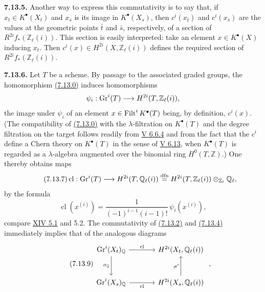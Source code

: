 \textbf{7.13.5.}
Another way to express this commutativity is to say that, if
$x_t\in K^\bullet(X_t)$ and $x_s$ is its image in $K^\bullet(X_s)$, then
$c^i(x_{\bar t})$ and $c^i(x_{\bar s})$ are the values at the geometric
points $\bar t$ and $\bar s$, respectively, of a section of
$R^{2i}f_*(\mathbb Z_\ell(i))$. This section is easily interpreted: take an
element $x\in K^\bullet(X)$ inducing $x_t$. Then
$c^i(x)\in H^{2i}(X,\mathbb Z_\ell(i))$ defines the required section of
$R^{2i}f_*(\mathbb Z_\ell(i))$.

\textbf{7.13.6.}
Let $T$ be a scheme. By passage to the associated graded groups, the
homomorphism \hyperlink{sga6.e10.eq.7-13-0}{(7.13.0)} induces homomorphisms
\[
\psi_i:\operatorname{Gr}^i(T)\longrightarrow H^{2i}(T,\mathbb Z_\ell(i)),
\]
the image under $\psi_i$ of an element $x\in\operatorname{Filt}^iK^\bullet(T)$ being, by
definition, $c^i(x)$. (The compatibility of \hyperlink{sga6.e10.eq.7-13-0}{(7.13.0)} with the
$\lambda$-filtration on
$K^\bullet(T)$ and the degree filtration on the target follows readily from
\hyperlink{sga6.e05.cor.6-6-4}{V 6.6.4} and from the fact that the $c^i$ define a
Chern theory on $K^\bullet(T)$ in the sense of \hyperlink{sga6.e05.def.6-13}{V 6.13}, when $K^\bullet(T)$ is
regarded as a $\lambda$-algebra augmented over the binomial ring
$H^0(T,\mathbb Z)$.) One thereby obtains maps
\begin{equation}\tag{7.13.7}
\operatorname{cl}:\operatorname{Gr}^i(T)\longrightarrow H^{2i}(T,\mathbb Q_\ell(i))
\stackrel{\mathrm{dfn}}{=}
H^{2i}(T,\mathbb Z_\ell(i))\otimes_{\mathbb Z_\ell}\mathbb Q_\ell,
\end{equation}
by the formula
\begin{equation}\tag{7.13.8}
\operatorname{cl}(x^{(i)})=
\frac{1}{(-1)^{i-1}(i-1)!}\,\psi_i(x^{(i)}),
\end{equation}
compare \hyperlink{sga6.e14.para.5-1}{XIV 5.1} and 5.2. The commutativity of \hyperlink{sga6.e10.eq.7-13-2}{(7.13.2)} and \hyperlink{sga6.e10.eq.7-13-4}{(7.13.4)}
immediately implies that of the analogous diagrams
\begin{equation}\tag{7.13.9}
\begin{tikzcd}[column sep=large,row sep=large]
\Gr^i(X_t)_{\mathbb Q} \arrow[r,"\operatorname{cl}"]
  \arrow[d,"\sigma_{\mathbb Q}"'] &
H^{2i}(X_t,\mathbb Q_\ell(i))\\
\Gr^i(X_s)_{\mathbb Q} \arrow[r,"\operatorname{cl}"'] &
H^{2i}(X_s,\mathbb Q_\ell(i)) \arrow[u,"\sigma'"]
\end{tikzcd}
\;,
\end{equation}
